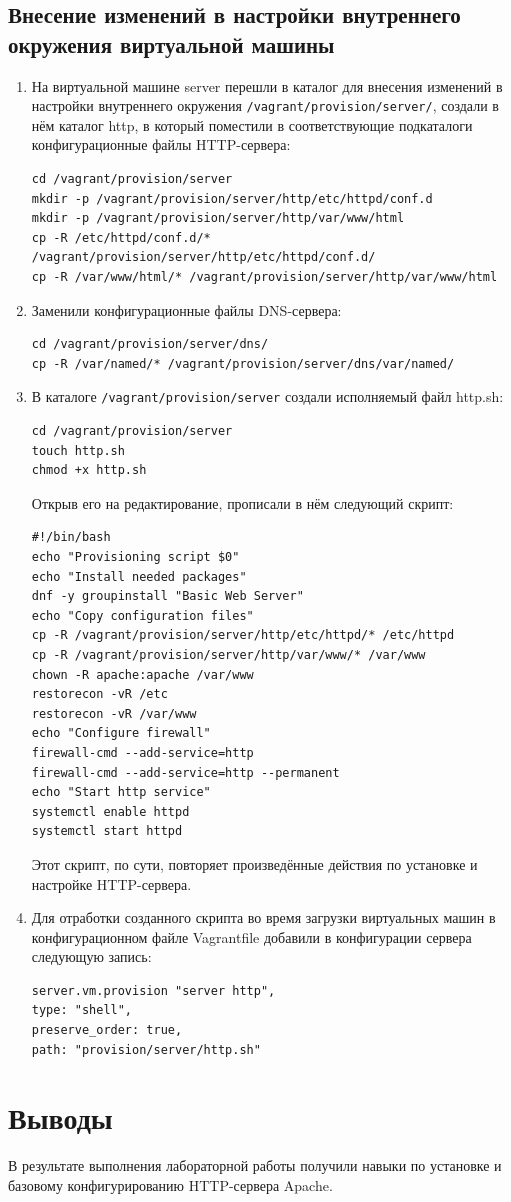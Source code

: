 \subsection{Внесение изменений в настройки внутреннего окружения виртуальной машины}
\begin{enumerate}
\item На виртуальной машине server перешли в каталог для внесения изменений в настройки внутреннего окружения {\tt /vagrant/provision/server/}, создали в нём каталог http, в который поместили в соответствующие подкаталоги конфигурационные файлы HTTP-сервера:
\begin{verbatim}
cd /vagrant/provision/server
mkdir -p /vagrant/provision/server/http/etc/httpd/conf.d
mkdir -p /vagrant/provision/server/http/var/www/html
cp -R /etc/httpd/conf.d/* /vagrant/provision/server/http/etc/httpd/conf.d/
cp -R /var/www/html/* /vagrant/provision/server/http/var/www/html
\end{verbatim}
\item Заменили конфигурационные файлы DNS-сервера:
\begin{verbatim}
cd /vagrant/provision/server/dns/
cp -R /var/named/* /vagrant/provision/server/dns/var/named/
\end{verbatim}

\item В каталоге {\tt /vagrant/provision/server} создали исполняемый файл http.sh:
\begin{verbatim}
cd /vagrant/provision/server
touch http.sh
chmod +x http.sh
\end{verbatim}
Открыв его на редактирование, прописали в нём следующий скрипт:
\begin{verbatim}
#!/bin/bash
echo "Provisioning script $0"
echo "Install needed packages"
dnf -y groupinstall "Basic Web Server"
echo "Copy configuration files"
cp -R /vagrant/provision/server/http/etc/httpd/* /etc/httpd
cp -R /vagrant/provision/server/http/var/www/* /var/www
chown -R apache:apache /var/www
restorecon -vR /etc
restorecon -vR /var/www
echo "Configure firewall"
firewall-cmd --add-service=http
firewall-cmd --add-service=http --permanent
echo "Start http service"
systemctl enable httpd
systemctl start httpd
\end{verbatim}
Этот скрипт, по сути, повторяет произведённые действия по установке и настройке HTTP-сервера.

\item Для отработки созданного скрипта во время загрузки виртуальных машин в конфигурационном файле Vagrantfile добавили в конфигурации сервера следующую запись:

\begin{verbatim}
server.vm.provision "server http",
type: "shell",
preserve_order: true,
path: "provision/server/http.sh"
\end{verbatim}
\end{enumerate}

\section{Выводы}
В результате выполнения лабораторной работы получили навыки по установке и базовому конфигурированию HTTP-сервера Apache.

